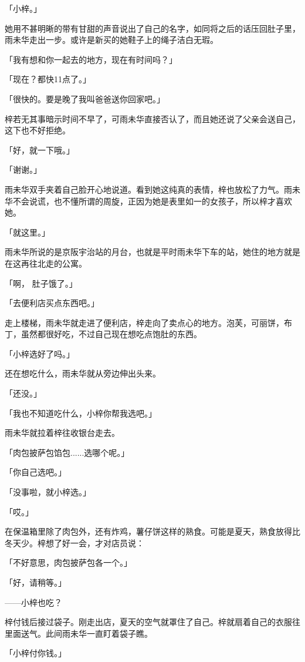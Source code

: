 \documentclass[UTF8]{ctexart}
\begin{document}
    「小梓。」

    她用不甚明晰的带有甘甜的声音说出了自己的名字，如同将之后的话压回肚子里，雨未华走出一步。或许是新买的她鞋子上的绳子洁白无瑕。

    「我有想和你一起去的地方，现在有时间吗？」

    「现在？都快11点了。」

    「很快的。要是晚了我叫爸爸送你回家吧。」

    梓若无其事暗示时间不早了，可雨未华直接否认了，而且她还说了父亲会送自己，这下也不好拒绝。

    「好，就一下哦。」

    「谢谢。」

    雨未华双手夹着自己脸开心地说道。看到她这纯真的表情，梓也放松了力气。雨未华不会说谎，也不懂所谓的周旋，正因为她是表里如一的女孩子，所以梓才喜欢她。

    「就这里。」

    雨未华所说的是京阪宇治站的月台，也就是平时雨未华下车的站，她住的地方就是在这再往北走的公寓。

    「啊， 肚子饿了。」

    「去便利店买点东西吧。」

    走上楼梯，雨未华就走进了便利店，梓走向了卖点心的地方。泡芙，可丽饼，布丁，虽然都很好吃，不过自己现在想吃点饱肚的东西。

    「小梓选好了吗。」

    还在想吃什么，雨未华就从旁边伸出头来。

    「还没。」

    「我也不知道吃什么，小梓你帮我选吧。」

    雨未华就拉着梓往收银台走去。

    「肉包披萨包馅包......选哪个呢。」

    「你自己选吧。」

    「没事啦，就小梓选。」

    「哎。」

    在保温箱里除了肉包外，还有炸鸡，薯仔饼这样的熟食。可能是夏天，熟食放得比冬天少。梓想了好一会，才对店员说：

    「不好意思，肉包披萨包各一个。」

    「好，请稍等。」

    ——小梓也吃？

    梓付钱后接过袋子。刚走出店，夏天的空气就罩住了自己。梓就扇着自己的衣服往里面送气。此间雨未华一直盯着袋子瞧。

    「小梓付你钱。」
\end{document}
